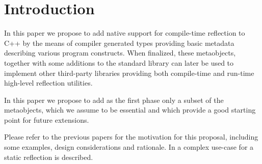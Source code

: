 \section{Introduction}

In this paper we propose to add native support for
compile-time reflection to C++ by the means of compiler generated
types providing basic metadata describing various program constructs.
When finalized, these metaobjects, together with some additions to the standard
library can later be used to implement other third-party libraries
providing both compile-time and run-time high-level
reflection utilities.

In this paper we propose to add as the first phase
only a subset of the metaobjects, which we assume to be essential
and which provide a good starting point for future extensions.

Please refer to the previous papers \cite{n3996,n4111,n4451,n4452}
for the motivation for this proposal, including some examples,
design considerations and rationale. In \cite{ITFPWTHOR} a complex use-case
for a static reflection is described.

